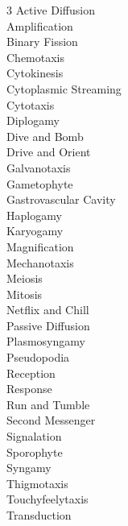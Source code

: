 
\begin{multicols}{3}
Active Diffusion \\
Amplification \\
Binary Fission \\
Chemotaxis \\
Cytokinesis \\
Cytoplasmic Streaming \\
Cytotaxis \\
Diplogamy \\
Dive and Bomb \\
Drive and Orient \\
Galvanotaxis \\
Gametophyte \\
Gastrovascular Cavity \\
Haplogamy \\
Karyogamy \\
Magnification \\
Mechanotaxis \\
Meiosis \\
Mitosis \\
Netflix and Chill \\
Passive Diffusion \\
Plasmosyngamy \\
Pseudopodia \\
Reception \\
Response \\
Run and Tumble \\
Second Messenger \\
Signalation \\
Sporophyte \\
Syngamy \\
Thigmotaxis \\
Touchyfeelytaxis \\
Transduction
\end{multicols}
